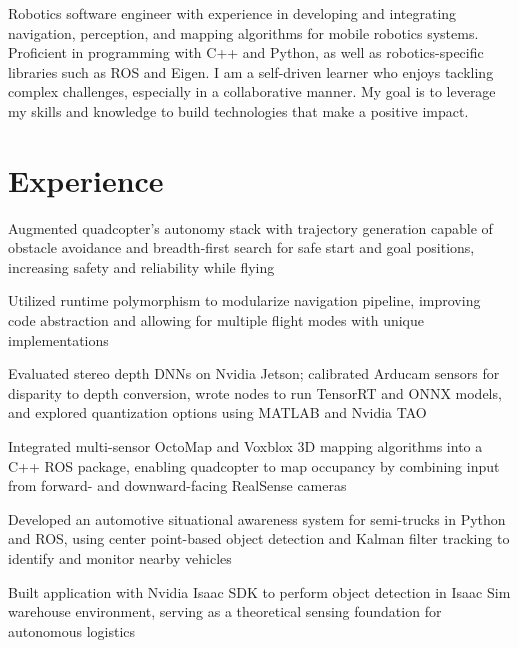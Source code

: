 \documentclass{resume}
\begin{document}


\begin{personalstatement}
    Robotics software engineer with experience in developing and integrating navigation, perception, and mapping algorithms for mobile robotics systems. Proficient in programming with C++ and Python, as well as robotics-specific libraries such as ROS and Eigen. I am a self-driven learner who enjoys tackling complex challenges, especially in a collaborative manner. My goal is to leverage my skills and knowledge to build technologies that make a positive impact.
\end{personalstatement}
    
\section{Experience}

\begin{details}
    \item Augmented quadcopter’s autonomy stack with trajectory generation capable of obstacle avoidance and breadth-first search for safe start and goal positions, increasing safety and reliability while flying
    \item Utilized runtime polymorphism to modularize navigation pipeline, improving code abstraction and allowing for multiple flight modes with unique implementations
    \item Evaluated stereo depth DNNs on Nvidia Jetson; calibrated Arducam sensors for disparity to depth conversion, wrote nodes to run TensorRT and ONNX models, and explored quantization options using MATLAB and Nvidia TAO
    \item Integrated multi-sensor OctoMap and Voxblox 3D mapping algorithms into a C++ ROS package, enabling quadcopter to map occupancy by combining input from forward- and downward-facing RealSense cameras
\end{details}

\begin{details}
    \item Developed an automotive situational awareness system for semi-trucks in Python and ROS, using center point-based object detection and Kalman filter tracking to identify and monitor nearby vehicles
    \item Built application with Nvidia Isaac SDK to perform object detection in Isaac Sim warehouse environment, serving as a theoretical sensing foundation for autonomous logistics
\end{details}
\end{document}
